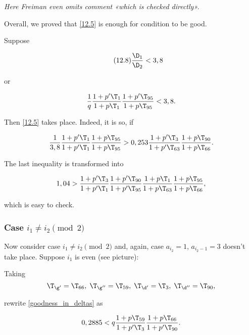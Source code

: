 {
	\itshape
	Here Freiman even omits comment «which is checked directly».
}

Overall, we proved that \ref{12.5} is enough for condition to be good.

Suppose

\begin{equation}\tag{12.8}\label{goodness_condition_3,8}
	\dfrac{\D_1}{\D_2} < 3,8
\end{equation}

or

\begin{equation*}
	\dfrac{1}{q}
	\dfrac{1 + p' \T_{1}}{1 + p \T_{1}}
	\dfrac{1 + p' \T_{95}}{1 + p \T_{95}}
	<
	3,8.
\end{equation*}

Then \ref{12.5} takes place. Indeed, it is so, if

\begin{equation*}
	\dfrac{1}{3,8}
	\dfrac{1 + p' \T_{1}}{1 + p' \T_{1}}
	\dfrac{1 + p \T_{95}}{1 + p \T_{95}}
	>
	0,253
	\dfrac{1 + p' \T_{3}}{1 + p' \T_{63}}
	\dfrac{1 + p \T_{90}}{1 + p \T_{66}}.
\end{equation*}

The last inequality is transformed into

\begin{equation*}
	1,04
	>
	\dfrac{1 + p' \T_{3}}{1 + p' \T_{1}}
	\dfrac{1 + p' \T_{90}}{1 + p' \T_{95}}
	\dfrac{1 + p \T_{1}}{1 + p \T_{63}}
	\dfrac{1 + p \T_{95}}{1 + p \T_{66}},
\end{equation*}

which is easy to check.

\subsubsection{Case $i_1 \ne i_2 \pmod 2$}

Now consider case $i_1 \ne i_2 \pmod 2$
and, again, case $a_{i_2} = 1$, $a_{i_2 - 1} = 3$
doesn't take place.
Suppose $i_1$ is even (see picture):


Taking
\begin{equation*}
	\T_{\g'} = \T_{66},\;
	\T_{\g''} = \T_{59},\;
	\T_{\d'} = \T_{3},\;
	\T_{\d''} = \T_{90},
\end{equation*}

rewrite \ref{goodness_in_deltas} as

\begin{equation}\label{12.9} %
	0,2885
	<
	q
	\dfrac{1 + p \T_{59}}{1 + p' \T_{3}}
	\dfrac{1 + p \T_{66}}{1 + p' \T_{90}}.
\end{equation}


